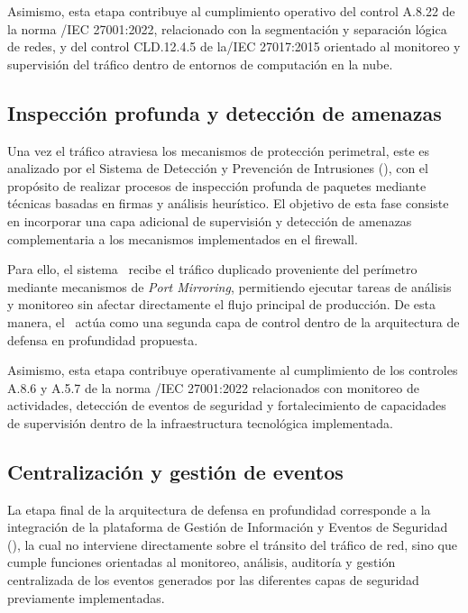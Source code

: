 Asimismo, esta etapa contribuye al cumplimiento operativo del control A.8.22 de la norma \ISO/IEC 27001:2022, relacionado con la 
segmentación y separación lógica de redes, y del control CLD.12.4.5 de la\ISO/IEC 27017:2015 orientado al monitoreo y supervisión del 
tráfico dentro de entornos de computación en la nube.

\subsection{Inspección profunda y detección de amenazas}
\noindent

Una vez el tráfico atraviesa los mecanismos de protección perimetral, este es analizado por el Sistema de Detección y Prevención de 
Intrusiones (\IDPS), con el propósito de realizar procesos de inspección profunda de paquetes mediante técnicas basadas en firmas y 
análisis heurístico. El objetivo de esta fase consiste en incorporar una capa adicional de supervisión y detección de amenazas 
complementaria a los mecanismos implementados en el firewall.

Para ello, el sistema \IDPS\ recibe el tráfico duplicado proveniente del perímetro mediante mecanismos de \textit{Port Mirroring}, 
permitiendo ejecutar tareas de análisis y monitoreo sin afectar directamente el flujo principal de producción. De esta manera, el \IDPS\ 
actúa como una segunda capa de control dentro de la arquitectura de defensa en profundidad propuesta.

Asimismo, esta etapa contribuye operativamente al cumplimiento de los controles A.8.6 y A.5.7 de la norma \ISO/IEC 27001:2022 relacionados 
con monitoreo de actividades, detección de eventos de seguridad y fortalecimiento de capacidades de supervisión dentro de la infraestructura 
tecnológica implementada.

\subsection{Centralización y gestión de eventos}
\noindent

La etapa final de la arquitectura de defensa en profundidad corresponde a la integración de la plataforma de Gestión de Información y 
Eventos de Seguridad (\SIEM), la cual no interviene directamente sobre el tránsito del tráfico de red, sino que cumple funciones 
orientadas al monitoreo, análisis, auditoría y gestión centralizada de los eventos generados por las diferentes capas de seguridad 
previamente implementadas.

